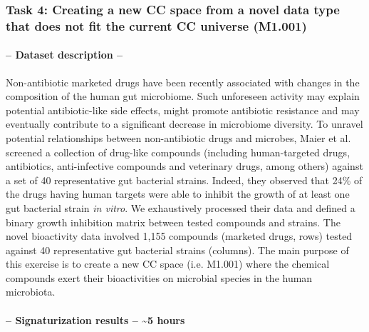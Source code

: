 

\subsubsection{Task 4: Creating a new CC space from a novel data type that does not fit the current CC universe (M1.001)}


\paragraph{-- Dataset description --} \leavevmode

Non-antibiotic marketed drugs have been recently associated with changes in the composition of the human gut microbiome\cite{weersma_interaction_2020}. Such unforeseen activity may explain potential antibiotic-like side effects, might promote antibiotic resistance and may eventually contribute to a significant decrease in microbiome diversity\cite{maier_extensive_2018}. To unravel potential relationships between non-antibiotic drugs and microbes, Maier et al.\cite{maier_extensive_2018} screened a collection of drug-like compounds (including human-targeted drugs, antibiotics, anti-infective compounds and veterinary drugs, among others) against a set of 40 representative gut bacterial strains. Indeed, they observed that 24\% of the drugs having human targets were able to inhibit the growth of at least one gut bacterial strain \textit{in vitro}. We exhaustively processed their data and defined a binary growth inhibition matrix between tested compounds and strains. The novel bioactivity data involved 1,155 compounds (marketed drugs, rows) tested against 40 representative gut bacterial strains (columns). The main purpose of this exercise is to create a new CC space (i.e. M1.001) where the chemical compounds exert their bioactivities on microbial species in the human microbiota.

\paragraph{-- Signaturization results -- \textasciitilde5 hours}  \leavevmode


